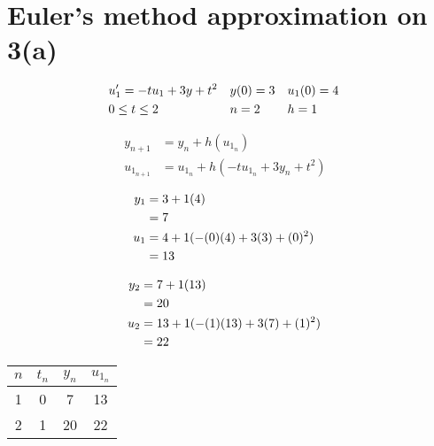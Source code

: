 \section{Euler's method approximation on 3(a)}
	\begin{align}
		&u_{1}' = -tu_{1} + 3y + t^{2}&
		&y(0) = 3&
		&u_{1}(0) = 4&
		\notag \\
		&0 \leq t \leq 2&
		&n = 2&
		&h = 1&
	\end{align}

	\begin{align}
		y_{n+1} &= y_{n} + h(u_{1_{n}})& \\
		u_{1_{n+1}} &= u_{1_{n}} + h(-tu_{1_{n}} + 3y_{n} + t^{2})&
	\end{align}

	\begin{align}
		y_{1} &= 3 + 1(4)& \notag \\
		&= 7& \\
		u_{1} &= 4 + 1(-(0)(4) + 3(3) + (0)^{2})& \notag \\
		&= 13&
	\end{align}

	\begin{align}
		y_{2} &= 7 + 1(13)& \notag \\
		&= 20& \\
		u_{2} &= 13 + 1(-(1)(13) + 3(7) + (1)^{2})& \notag \\
		&= 22&
	\end{align}

	\begin{table}[H]
		\centering
		\begin{tabular}{|c|c|c|c|}
			\hline
			$n$ & $t_{n}$ & $y_{n}$ & $u_{1_{n}}$ \\ \hline
			1 & 0 & 7 & 13 \\ \hline
			2 & 1 & 20 & 22 \\ \hline
		\end{tabular}
	\end{table}
